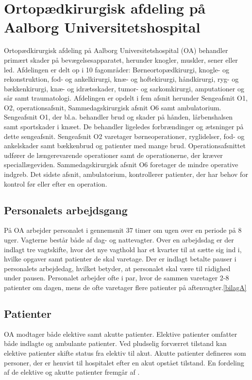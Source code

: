 \section{Ortopædkirurgisk afdeling på Aalborg Universitetshospital}
Ortopædkirurgisk afdeling på Aalborg Universitetshospital (OA) behandler primært skader på bevægelsesapparatet, herunder knogler, muskler, sener eller led. Afdelingen er delt op i 10 fagområder: Børneortopædkirurgi, knogle- og rekonstruktion, fod- og ankelkirurgi, knæ- og hoftekirurgi, håndkirurgi, ryg- og bækkenkirurgi, knæ- og idrætsskader, tumor- og sarkomkirurgi, amputationer og sår samt traumatologi. Afdelingen er opdelt i fem afsnit herunder Sengeafsnit O1, O2, operationsafsnit, Sammedagskirurgisk afsnit O6 samt ambulatorium. 
Sengeafsnit O1, der bl.a. behandler brud og skader på hånden, lårbenshalsen samt sportskader i knæet. De behandler ligeledes forbrændinger og ætsninger på dette sengeafsnit. Sengeafsnit O2 varetager børneoperationer, ryglidelser, fod- og ankelskader samt bækkenbrud og patienter med mange brud. Operationsafsnittet udfører de længerevarende operationer samt de operationerne, der kræver speciallægeviden. Sammedagskirurgisk afsnit O6 foretager de mindre operative indgreb. Det sidste afsnit, ambulatorium, kontrollerer patienter, der har behov for kontrol før eller efter en operation.\cite{Aalborg2016}

\subsection{Personalets arbejdsgang}
På OA arbejder personalet i gennemsnit 37 timer om ugen\cite{Danske2015} over en periode på 8 uger. Vagterne består både af dag- og nattevagter. Over en arbejdsdag er der indlagt tre vagtskifte, hvor det nye vagthold har et kvarter til at sætte sig ind i, hvilke opgaver samt patienter de skal varetage. Der er indlagt betalte pauser i personalets arbejdedag, hvilket betyder, at personalet skal være til rådighed under pausen. Personalet arbejder ofte i par, hvor de sammen varetager 2-8 patienter om dagen, mens de ofte varetager flere patienter på aftenvagter.\ref{bilagA}

\subsection{Patienter}
OA modtager både elektive samt akutte patienter. Elektive patienter omfatter både indlagte og ambulante patienter. Ved pludselig forværret tilstand kan elektive patienter skifte status fra elektiv til akut. Akutte patienter defineres som personer, der er henvist til hospitalet efter en akut opstået tilstand.\cite{RegionNord2016} En fordeling af de elektive og akutte patienter fremgår af .

